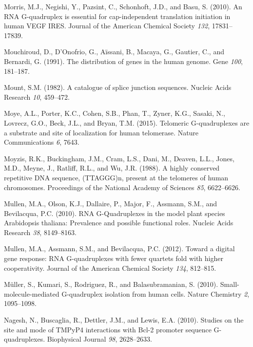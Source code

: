 \documentclass[12pt,a4paper,]{report}
\begin{document}
\leavevmode\hypertarget{ref-Morris2010}{}%
Morris, M.J., Negishi, Y., Pazsint, C., Schonhoft, J.D., and Basu, S.
(2010). An RNA G-quadruplex is essential for cap-independent translation
initiation in human VEGF IRES. Journal of the American Chemical Society
\emph{132}, 17831--17839.

\leavevmode\hypertarget{ref-Mouchiroud1991}{}%
Mouchiroud, D., D'Onofrio, G., Aïssani, B., Macaya, G., Gautier, C., and
Bernardi, G. (1991). The distribution of genes in the human genome. Gene
\emph{100}, 181--187.

\leavevmode\hypertarget{ref-Mount1982}{}%
Mount, S.M. (1982). A catalogue of splice junction sequences. Nucleic
Acids Research \emph{10}, 459--472.

\leavevmode\hypertarget{ref-Moye2015}{}%
Moye, A.L., Porter, K.C., Cohen, S.B., Phan, T., Zyner, K.G., Sasaki,
N., Lovrecz, G.O., Beck, J.L., and Bryan, T.M. (2015). Telomeric
G-quadruplexes are a substrate and site of localization for human
telomerase. Nature Communications \emph{6}, 7643.

\leavevmode\hypertarget{ref-Moyzis1988}{}%
Moyzis, R.K., Buckingham, J.M., Cram, L.S., Dani, M., Deaven, L.L.,
Jones, M.D., Meyne, J., Ratliff, R.L., and Wu, J.R. (1988). A highly
conserved repetitive DNA sequence, (TTAGGG)n, present at the telomeres
of human chromosomes. Proceedings of the National Academy of Sciences
\emph{85}, 6622--6626.

\leavevmode\hypertarget{ref-Mullen2010}{}%
Mullen, M.A., Olson, K.J., Dallaire, P., Major, F., Assmann, S.M., and
Bevilacqua, P.C. (2010). RNA G-Quadruplexes in the model plant species
Arabidopsis thaliana: Prevalence and possible functional roles. Nucleic
Acids Research \emph{38}, 8149--8163.

\leavevmode\hypertarget{ref-Mullen2012}{}%
Mullen, M.A., Assmann, S.M., and Bevilacqua, P.C. (2012). Toward a
digital gene response: RNA G-quadruplexes with fewer quartets fold with
higher cooperativity. Journal of the American Chemical Society
\emph{134}, 812--815.

\leavevmode\hypertarget{ref-Muller2010}{}%
Müller, S., Kumari, S., Rodriguez, R., and Balasubramanian, S. (2010).
Small-molecule-mediated G-quadruplex isolation from human cells. Nature
Chemistry \emph{2}, 1095--1098.

\leavevmode\hypertarget{ref-Nagesh2010}{}%
Nagesh, N., Buscaglia, R., Dettler, J.M., and Lewis, E.A. (2010).
Studies on the site and mode of TMPyP4 interactions with Bcl-2 promoter
sequence G-quadruplexes. Biophysical Journal \emph{98}, 2628--2633.
\end{document}
